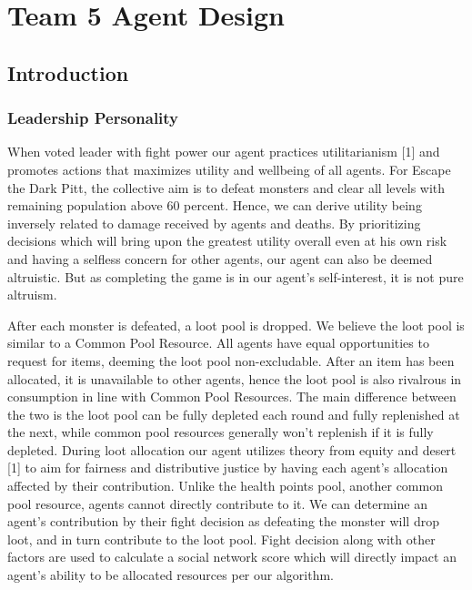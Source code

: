 \useunder{\uline}{\ul}{}
\chapter{Team 5 Agent Design}\label{team_5_agent_design}
\section{Introduction}
\subsection{Leadership Personality}

When voted leader with fight power our agent practices utilitarianism [1] and promotes actions that maximizes utility and wellbeing of all agents. For Escape the Dark Pitt, the collective aim is to defeat monsters and clear all levels with remaining population above 60 percent. Hence, we can derive utility being inversely related to damage received by agents and deaths. By prioritizing decisions which will bring upon the greatest utility overall even at his own risk and having a selfless concern for other agents, our agent can also be deemed altruistic. But as completing the game is in our agent's self-interest, it is not pure altruism.

After each monster is defeated, a loot pool is dropped. We believe the loot pool is similar to a Common Pool Resource. All agents have equal opportunities to request for items, deeming the loot pool non-excludable. After an item has been allocated, it is unavailable to other agents, hence the loot pool is also rivalrous in consumption in line with Common Pool Resources. The main difference between the two is the loot pool can be fully depleted each round and fully replenished at the next, while common pool resources generally won't replenish if it is fully depleted. During loot allocation our agent utilizes theory from equity and desert [1] to aim for fairness and distributive justice by having each agent's allocation affected by their contribution. Unlike the health points pool, another common pool resource, agents cannot directly contribute to it. We can determine an agent's contribution by their fight decision as defeating the monster will drop loot, and in turn contribute to the loot pool. Fight decision along with other factors are used to calculate a social network score which will directly impact an agent's ability to be allocated resources per our algorithm.

